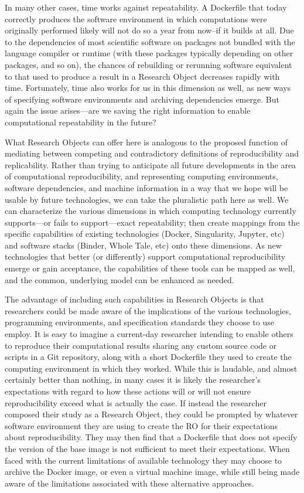 In many other cases, time works against repeatability.
A Dockerfile that today correctly produces the software environment in which computations were originally
	performed likely will not do so a year from now--if it builds at all.
Due to the dependencies of most scientific software on packages not
	bundled with the language compiler or runtime (with these packages typically depending on 
	other packages, and so on), the chances of rebuilding or rerunning software
	equivalent to that used to produce a result in a Research Object decreases
	rapidly with time.
Fortunately, time also works for us in this dimension as well, as new ways of specifying software
	environments and archiving dependencies emerge.
But again the issue arises---are we saving the right information to enable computational repeatability
	in the future?

What Research Objects can offer here is analogous to the proposed function of mediating between competing
	and contradictory definitions of reproducibility and replicability.
Rather than trying to anticipate all future developments in the area of computational reproducibility,
	and representing computing environments, software dependencies, and machine information
	in a way that we hope will be usable by future technologies, we can take the pluralistic
	path here as well. 
We can characterize the various dimensions in which computing technology currently supports---or fails to
	support---exact repeatability; then create mappings from the specific capabilities
	of existing technologies (Docker, Singularity, Jupyter, etc) and software stacks (Binder, Whole Tale, etc)
	onto these dimensions.
As new technologies that better (or differently) support computational reproducibility emerge or gain acceptance,
	the capabilities of these tools can be mapped as well, and the common, underlying model can be enhanced as needed.
 
The advantage of including such capabilities in Research Objects is that researchers could be made aware
	of the implications of the various technologies, programming environments, and specification
	standards they choose to use employ.
It is easy to imagine a current-day researcher intending to enable others to reproduce their computational
	results sharing any custom source code or scripts in a Git repository, along with a short Dockerfile
	they used to create the computing environment in which they worked.
While this is laudable, and almost certainly better than nothing, in many cases it is likely the researcher's
	expectations with regard to how these actions will or will not ensure reproducibility exceed
	what is actually the case.
If instead the researcher composed their study as a Research Object, they could be prompted by whatever
	software environment they are using to create the RO for their expectations about reproducibility.
They may then find that a Dockerfile that does not specify the version of the base image is not sufficient
	to meet their expectations.
When faced with the current limitations of available technology they may choose to archive the Docker image, 
	or even a virtual machine image, while still being made aware of the limitations associated with these alternative
	approaches.

